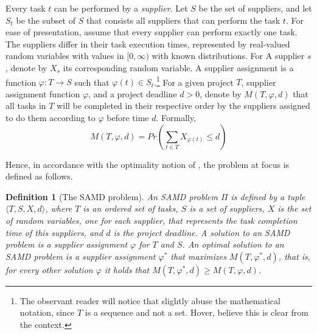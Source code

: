 \documentclass[letterpaper]{article} %
\newtheorem{definition}{Definition}
\newcommand{\samd}{\ac{SAMD}\xspace}
\begin{document}
Every task $t$ can be performed by a \emph{supplier}.
Let $S$ be the set of suppliers, and let $S_t$ be the subset of $S$ that consists all suppliers that
can perform the task $t$. For ease of presentation,  assume that every supplier can perform exactly one task. The suppliers differ in their task execution times, represented by real-valued random variables with values in $[0, \infty)$ with known distributions. For A supplier $s$,  denote by $X_s$ its corresponding random variable.
A supplier assignment is a function $\varphi: T\rightarrow S$ such that $\varphi(t)\in S_t$.\footnote{The observant reader will notice that  slightly abuse the mathematical notation, since $T$ is a sequence and not a set. Hover,  believe this is clear from the context.}
For a given project $T$, supplier assignment function $\varphi$, and a project deadline $d>0$,  denote by
$M(T, \varphi, d)$ that
all tasks in $T$ will be completed in their respective order by the suppliers assigned to do them according to $\varphi$
before time $d$. Formally,
\begin{equation}
M(T, \varphi, d) = Pr\left(\sum_{t\in T} X_{\varphi(t)}\leq d\right)
 \label{eq:objective}
\end{equation}

Hence, in accordance with the optimality notion of \citeauthor{frank1969shortest},
the problem at focus is defined as follows.
\begin{definition}[The \samd problem]
An \samd problem $\Pi$ is defined by a tuple
 $\langle T, S, X, d\rangle$,
 where $T$ is an ordered set of tasks,
 $S$ is a set of suppliers,
 $X$ is the set of random variables, one for each supplier, that represents the task completion time of this suppliers,
 and $d$ is the project deadline.
 A solution to an \samd problem is a supplier assignment $\varphi$ for $T$ and $S$. An optimal solution to an \samd problem is
 a supplier assignment $\varphi^*$ that maximizes $M(T, \varphi^*, d)$, that is, for every other solution  $\varphi$ it holds that $M(T, \varphi^*, d)\geq M(T, \varphi, d)$.
\end{definition}
\end{document}
